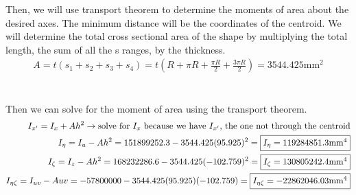 \documentclass[12 pt]{article}
\begin{document}
Then, we will use transport theorem to determine the moments of area about the desired axes. The minimum distance will
be the coordinates of the centroid. We will determine the total cross sectional area of the shape by multiplying the
total length, the sum of all the s ranges, by the thickness.
\begin{align*}
    A = t(s_1+s_2+s_3+s_4)=t(R+\pi R+\frac{\pi R}{2}+\frac{3\pi R}{2}) = 3544.425 \textrm{mm}^2
\end{align*} \\ \\ 
Then we can solve for the moment of area using the transport theorem.
\begin{align*}
    I_{x'} = I_x + Ah^2 \rightarrow \textrm{solve for $I_x$ because we have $I_{x'}$, the one not through the centroid}\\
    I_\eta = I_u - Ah^2 = 151899252.3 - 3544.425(95.925)^2 = \fbox{$I_\eta = 119284851.3 \textrm{mm}^4$} \\
    I_\zeta = I_z - Ah^2 = 168232286.6 - 3544.425(-102.759)^2 = \fbox{$I_\zeta = 130805242.4 \textrm{mm}^4$} \\
    I_{\eta \zeta} = I_{uv} - Auv = -57800000 - 3544.425(95.925)(-102.759) = \fbox{$I_{\eta \zeta} = -22862046.03 \textrm{mm}^4$}
\end{align*}
\end{document}
